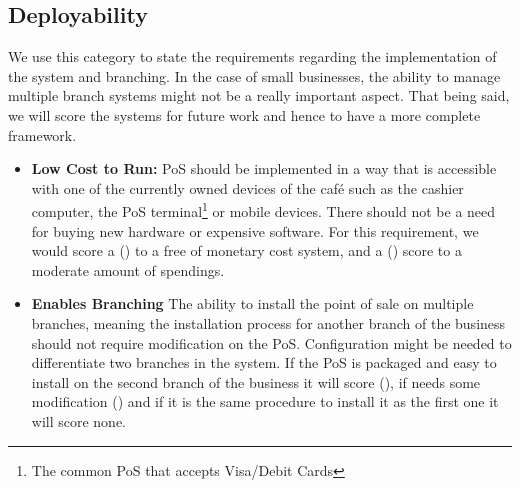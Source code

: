\subsection{Deployability} We use this category to state the requirements regarding the implementation of the system and branching. In the case of small businesses, the ability to manage multiple branch systems might not be a really important aspect. That being said, we will score the systems for future work and hence to have a more complete framework.
\begin{itemize}

\item \textbf{Low Cost to Run: }PoS should be implemented in a way that is accessible with one of the currently owned devices of the caf\'{e} such as the cashier computer, the PoS terminal\footnote{The common PoS that accepts Visa/Debit Cards} or mobile devices. There should not be a need for buying new hardware or expensive software. For this requirement, we would score a (\full) to a free of monetary cost system, and a (\prt) score to a moderate amount of spendings.

\item \textbf{Enables Branching} The ability to install the point of sale on multiple branches, meaning the installation process for another branch of the business should not require modification on the PoS. Configuration might be needed to differentiate two branches in the system. If the PoS is packaged and easy to install on the second branch of the business it will score (\full), if needs some modification (\prt) and if it is the same procedure to install it as the first one it will score none.

\end{itemize}
 
